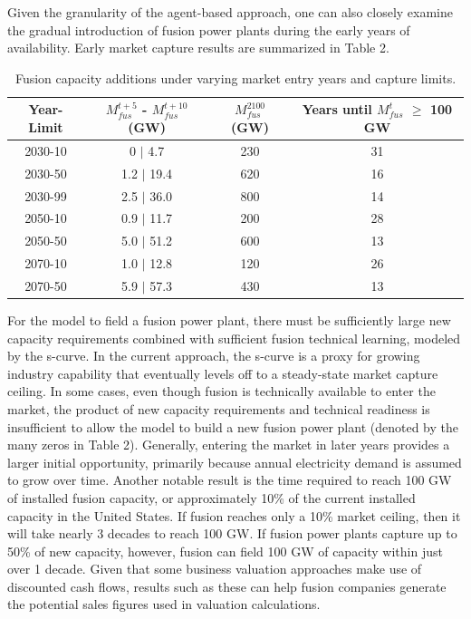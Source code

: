 \documentclass[review]{elsarticle}
\begin{document}
Given the granularity of the agent-based approach, one can also closely examine the gradual introduction of fusion power plants during the early years of availability. Early market capture results are summarized in Table 2.

\begin{table}[!htbp]
	\centering
	\scriptsize
	\caption{Fusion capacity additions under varying market entry years and capture limits.}
	\label{tNomenclature}
	\begin{tabular}{cccc}
Year-Limit & $M_{fus}^{t+5}$ - $M_{fus}^{t+10}$ (GW) & $M_{fus}^{2100}$ (GW) & Years until $M_{fus}^t$ $\geq$ 100 GW \\ \hline \hline
2030-10 & 0 $\vert$ 4.7 	& 230 &  31 \\
2030-50 & 1.2 $\vert$ 19.4	& 620 &  16 \\
2030-99 & 2.5 $\vert$ 36.0 	& 800 &  14 \\ \hline
2050-10 & 0.9 $\vert$ 11.7 	& 200 &  28 \\
2050-50 & 5.0 $\vert$ 51.2	& 600 &  13 \\ \hline
2070-10 & 1.0 $\vert$ 12.8 	& 120 &  26 \\
2070-50 & 5.9 $\vert$ 57.3	& 430 &  13 \\ \hline
	\end{tabular}
\end{table}


For the model to field a fusion power plant, there must be sufficiently large new capacity requirements combined with sufficient fusion technical learning, modeled by the s-curve. In the current approach, the s-curve is a proxy for growing industry capability that eventually levels off to a steady-state market capture ceiling. In some cases, even though fusion is technically available to enter the market, the product of new capacity requirements and technical readiness is insufficient to allow the model to build a new fusion power plant (denoted by the many zeros in Table 2). Generally, entering the market in later years provides a larger initial opportunity, primarily because annual electricity demand is assumed to grow over time. Another notable result is the time required to reach 100 GW of installed fusion capacity, or approximately 10\% of the current installed capacity in the United States. If fusion reaches only a 10\% market ceiling, then it will take nearly 3 decades to reach 100 GW. If fusion power plants capture up to 50\% of new capacity, however, fusion can field 100 GW of capacity within just over 1 decade. Given that some business valuation approaches make use of discounted cash flows, results such as these can help fusion companies generate the potential sales figures used in valuation calculations.
\end{document}
